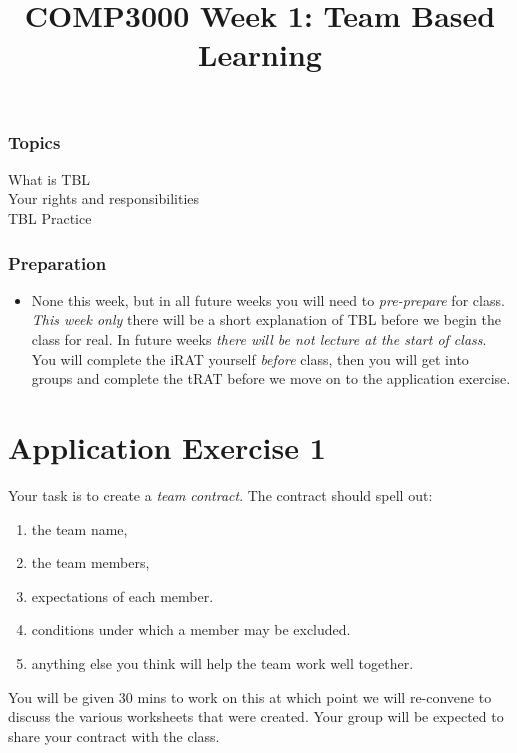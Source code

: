 \documentclass[twoside=false,DIV=14]{scrartcl}
\title{\color{redish} \vspace{-1em}COMP3000 Week 1: Team Based Learning}
\begin{document}
{\color{blackish}\maketitle}\vspace{-7em}

\begin{abstract}
\end{abstract}

\section*{Topics}
\begin{description}
\item[What is TBL]  
\item[Your rights and responsibilities]  
\item[TBL Practice]
\end{description}
\section*{Preparation}
\begin{itemize}
\item None this week, but in all future weeks you will need to \emph{pre-prepare} for class.  \emph{This week only} there will be a short explanation of TBL before we begin the class for real.  In future weeks \emph{there will be not lecture at the start of class}.  You will complete the iRAT yourself \emph{before} class, then you will get into groups and complete the tRAT before we move on to the application exercise.
\end{itemize}


\newpage
\part*{Application Exercise 1}
Your task is to create a \emph{team contract}.  The contract should spell out:
\begin{enumerate}
\item the team name, 
\item the team members, 
\item expectations of each member.  
\item conditions under which a member may be excluded.
\item anything else you think will help the team work well together.
\end{enumerate}

You will be given 30 mins to work on this at which point we will re-convene to discuss the various worksheets that were created.  Your group will be expected to share your contract with the class.
\end{document}
